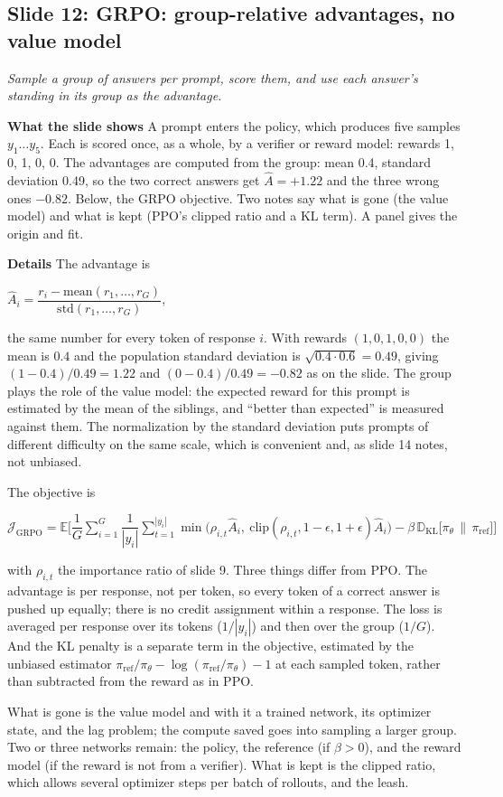 \documentclass[11pt,letterpaper]{article}
\newcommand{\slide}[3]{%
  \subsection[Slide #1: #2]{Slide #1: #2}%
  {\color{muted}\itshape #3\par}\medskip}
\newcommand{\para}[1]{\medskip\noindent\textbf{#1}\quad}
\newenvironment{formulas}{\begin{tcolorbox}[formulabox]}{\end{tcolorbox}}
\newcommand{\piref}{\pi_{\mathrm{ref}}}
\newcommand{\pit}{\pi_\theta}\newcommand{\KL}{\mathrm{KL}}
\begin{document}
\slide{12}{GRPO: group-relative advantages, no value model}{Sample a group of answers per prompt, score them, and use each answer's standing in its group as the advantage.}

\para{What the slide shows} A prompt enters the policy, which produces five samples $y_1\ldots y_5$. Each is scored once, as a whole, by a verifier or reward model: rewards 1, 0, 1, 0, 0. The advantages are computed from the group: mean 0.4, standard deviation 0.49, so the two correct answers get $\hat A=+1.22$ and the three wrong ones $-0.82$. Below, the GRPO objective. Two notes say what is gone (the value model) and what is kept (PPO's clipped ratio and a KL term). A panel gives the origin and fit.

\para{Details} The advantage is
\begin{formulas}
$\hat A_i=\dfrac{r_i-\mathrm{mean}(r_1,\ldots,r_G)}{\mathrm{std}(r_1,\ldots,r_G)}$,
\end{formulas}
the same number for every token of response $i$. With rewards $(1,0,1,0,0)$ the mean is $0.4$ and the population standard deviation is $\sqrt{0.4\cdot0.6}=0.49$, giving $(1-0.4)/0.49=1.22$ and $(0-0.4)/0.49=-0.82$ as on the slide. The group plays the role of the value model: the expected reward for this prompt is estimated by the mean of the siblings, and ``better than expected'' is measured against them. The normalization by the standard deviation puts prompts of different difficulty on the same scale, which is convenient and, as slide 14 notes, not unbiased.

The objective is
\begin{formulas}
$\mathcal{J}_{\text{GRPO}}=\mathbb{E}\Big[\dfrac{1}{G}\displaystyle\sum_{i=1}^{G}\dfrac{1}{|y_i|}\sum_{t=1}^{|y_i|}\min\big(\rho_{i,t}\hat A_i,\ \mathrm{clip}(\rho_{i,t},1-\epsilon,1+\epsilon)\hat A_i\big)-\beta\,\mathbb{D}_{\KL}\big[\pit\,\|\,\piref\big]\Big]$
\end{formulas}
with $\rho_{i,t}$ the importance ratio of slide 9. Three things differ from PPO. The advantage is per response, not per token, so every token of a correct answer is pushed up equally; there is no credit assignment within a response. The loss is averaged per response over its tokens ($1/|y_i|$) and then over the group ($1/G$). And the KL penalty is a separate term in the objective, estimated by the unbiased estimator $\piref/\pit-\log(\piref/\pit)-1$ at each sampled token, rather than subtracted from the reward as in PPO.

What is gone is the value model and with it a trained network, its optimizer state, and the lag problem; the compute saved goes into sampling a larger group. Two or three networks remain: the policy, the reference (if $\beta>0$), and the reward model (if the reward is not from a verifier). What is kept is the clipped ratio, which allows several optimizer steps per batch of rollouts, and the leash.
\end{document}
